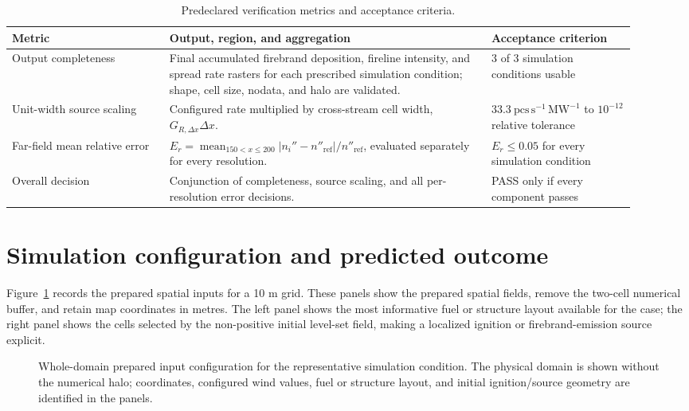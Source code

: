 \begin{table}[H]
\centering
\footnotesize
\caption{Predeclared verification metrics and acceptance criteria.}
\label{tab:acceptance-contract}
\begin{tabular}{@{}p{0.23\linewidth}p{0.47\linewidth}p{0.21\linewidth}@{}}
\toprule
Metric & Output, region, and aggregation & Acceptance criterion\\
\midrule
Output completeness & Final accumulated firebrand deposition, fireline intensity, and spread rate rasters for each prescribed simulation condition; shape, cell size, nodata, and halo are validated. & 3 of 3 simulation conditions usable \\
Unit-width source scaling & Configured rate multiplied by cross-stream cell width, \(G_{R,\Delta x}\Delta x\). & \(33.3\ \mathrm{pcs\,s^{-1}\,MW^{-1}}\) to \(10^{-12}\) relative tolerance \\
Far-field mean relative error & \(E_r=\operatorname{mean}_{150<x\le200}|n_i''-n''_{\mathrm{ref}}|/n''_{\mathrm{ref}}\), evaluated separately for every resolution. & \(E_r\le0.05\) for every simulation condition \\
Overall decision & Conjunction of completeness, source scaling, and all per-resolution error decisions. & PASS only if every component passes \\
\bottomrule
\end{tabular}
\end{table}

\section{Simulation configuration and predicted outcome}

Figure~\ref{fig:input-configuration} records the prepared spatial inputs for a 10 m grid.
These panels show the prepared spatial fields, remove the
two-cell numerical buffer, and retain map coordinates in metres.  The left panel shows
the most informative fuel or structure layout available for the case; the right panel
shows the cells selected by the non-positive initial level-set field, making a localized
ignition or firebrand-emission source explicit.

\begin{figure}[H]
\centering
{}
\caption{Whole-domain prepared input configuration for the representative simulation condition.  The
physical domain is shown without the numerical halo; coordinates, configured wind values,
fuel or structure layout, and initial ignition/source geometry are identified in the panels.}
\label{fig:input-configuration}
\end{figure}

